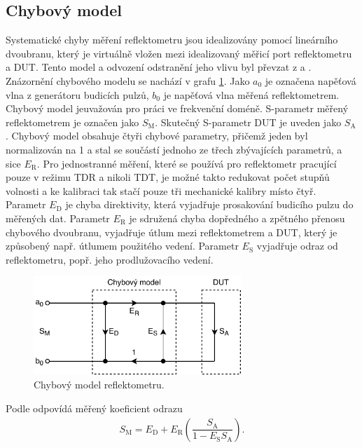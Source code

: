 \subsection{Chybový model}
Systematické chyby měření reflektometru jsou idealizovány pomocí lineárního dvoubranu, který je virtuálně vložen mezi idealizovaný měřicí port reflektometru a \acrshort{DUT}. Tento model a odvození odstranění jeho vlivu byl převzat z \cite{time_domain_analyzer_calibration} a \cite{time_domain_analyzer_calibration_normalization}. Znázornění chybového modelu se nachází v grafu \ref{error_model}. Jako $a_0$ je označena napěťová vlna z generátoru budicích pulzů, $b_0$ je napěťová vlna měřená reflektometrem. Chybový model jeuvažován pro práci ve frekvenční doméně. S-parametr měřený reflektometrem je označen jako $S_\mathrm{M}$. Skutečný S-parametr DUT je uveden jako $S_\mathrm{A}$. Chybový model obsahuje čtyři chybové parametry, přičemž jeden byl normalizován na 1 a stal se součástí jednoho ze třech zbývajících parametrů, a sice $E_\textrm{R}$. Pro jednostranné měření, které se používá pro reflektometr pracující pouze v režimu TDR a nikoli \acrshort{TDT}, je možné takto redukovat počet stupňů volnosti a ke kalibraci tak stačí pouze tři mechanické kalibry místo čtyř. Parametr $E_\textrm{D}$ je chyba direktivity, která vyjadřuje prosakování budicího pulzu do měřených dat. Parametr $E_\textrm{R}$ je sdružená chyba dopředného a zpětného přenosu chybového dvoubranu, vyjadřuje útlum mezi reflektometrem a DUT, který je způsobený např. útlumem použitého vedení. Parametr $E_\textrm{S}$ vyjadřuje odraz od reflektometru, popř. jeho prodlužovacího vedení.
\begin{figure}[htbp]
\includegraphics[width=0.7\textwidth,keepaspectratio]{images/error_box.pdf}\caption{Chybový model reflektometru.}\label{error_model}
\end{figure}

Podle \cite{time_domain_analyzer_calibration_normalization} odpovídá měřený koeficient odrazu
\begin{equation}
\begin{gathered}
	S_\mathrm{M} = E_\textrm{D} + E_\textrm{R} \left( \dfrac{S_\mathrm{A}}{1-E_\mathrm{S} S_\mathrm{A}} \right). 
\end{gathered}
\end{equation}

